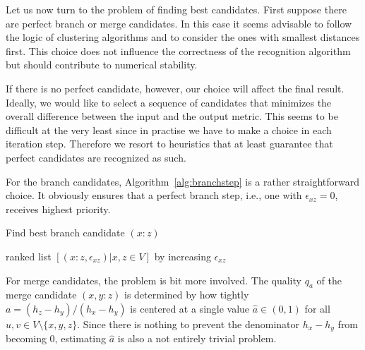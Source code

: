 \documentclass{article}
\begin{document}
Let us now turn to the problem of finding best candidates. First suppose
there are perfect branch or merge candidates. In this case it seems
advisable to follow the logic of clustering algorithms and to consider the 
ones with smallest distances first. This choice does not influence the
correctness of the recognition algorithm but should contribute to numerical
stability.

If there is no perfect candidate, however, our choice will affect the final
result. Ideally, we would like to select a sequence of candidates that
minimizes the overall difference between the input and the output metric.
This seems to be difficult at the very least since in practise we have to
make a choice in each iteration step. Therefore we resort to heuristics
that at least guarantee that perfect candidates are recognized as such.

For the branch candidates, Algorithm~\ref{alg:branchstep} is a rather
straightforward choice. It obviously ensures that a perfect branch step,
i.e., one with $\epsilon_{xz}=0$, receives highest priority.

\begin{algorithm}[H]
\caption{Find best branch candidate $(x:z)$ } 
\label{alg:branchstep}
\SetAlgoLined
{}
\Return ranked list $[(x:z,\epsilon_{xz})| x,z\in V]$ by increasing 
$\epsilon_{xz}$\;
\end{algorithm} 

For merge candidates, the problem is bit more involved. The quality $q_a$
of the merge candidate $(x,y:z)$ is determined by how tightly
$a=(h_z-h_y)/(h_x-h_y)$ is centered at a single value $\hat a\in (0,1)$ for
all $u,v\in V\setminus\{x,y,z\}$. Since there is nothing to prevent the
denominator $h_x-h_y$ from becoming $0$, estimating $\hat a$ is also a not
entirely trivial problem.
\end{document}

